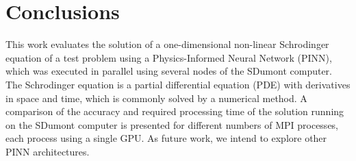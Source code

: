 \documentclass[conference]{IEEEtran}
\begin{document}
%
\section{Conclusions}\label{sec:conc}
%
This work evaluates the solution of a one-dimensional non-linear Schrodinger equation of a test problem using a Physics-Informed Neural Network (PINN), which was executed in parallel using several nodes of the SDumont computer. The Schrodinger equation is a partial differential equation (PDE) with derivatives in space and time, which is commonly solved by a numerical method. A comparison of the accuracy and required processing time of the solution running on the SDumont computer is presented for different numbers of MPI processes, each process using a single GPU. As future work, we intend to explore other PINN architectures.







%
\FloatBarrier


%
\end{document}
